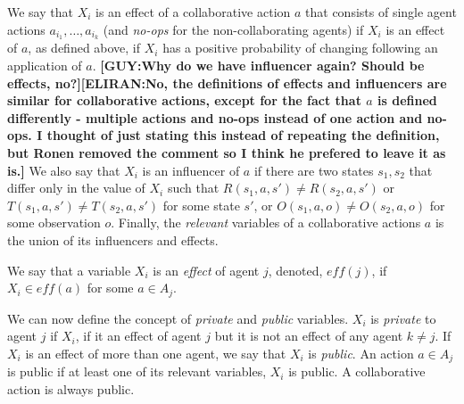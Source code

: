 \documentclass[letterpaper]{article} %
\theoremstyle{definition}
\newcommand{\eliran}[1]{\textbf{[\color{red}ELIRAN:#1]}}
\newcommand{\ronen}[1]{\textbf{[\color{blue}RONEN:#1]}}
\newcommand{\guy}[1]{\textbf{[\color{orange}GUY:#1]}}
\newcommand{\eff}{\mathit{eff}}
\begin{document}
We say that $X_i$ is an effect of a collaborative action $a$ that consists of single agent actions
$a_{i_1},\ldots,a_{i_k}$ (and {\em no-ops} for the non-collaborating agents) if $X_i$ is an effect of $a$, as defined above, if $X_i$ has a positive probability of changing following an application of $a$.
\guy{Why do we have influencer again? Should be effects, no?}\eliran{No, the definitions of effects and influencers are similar for collaborative actions, except for the fact that $a$ is defined differently - multiple actions and no-ops instead of one action and no-ops. I thought of just stating this instead of repeating the definition, but Ronen removed the comment so I think he prefered to leave it as is.}
We also say that $X_i$ is an influencer of $a$ if there are two states $s_1,s_2$ that differ only in the value of $X_i$ such that $R(s_1,a,s')\neq R(s_2,a,s')$ or $T(s_1,a,s')\neq T(s_2,a,s')$ for some state $s'$, or $O(s_1,a,o)\neq O(s_2,a,o)$ for some observation $o$.
Finally, the {\em relevant} variables of a collaborative actions $a$ is the union of its influencers and effects.
%


We say that a variable $X_i$ is an \emph{effect} of agent $j$, denoted,
$\eff(j)$, if  $X_i\in \eff(a)$ for some $a\in A_j$.

We can now define the concept of {\em private} and {\em public} variables. $X_i$ is {\em private} to agent $j$ if $X_i$, if it an effect of agent $j$ but it is not an effect of any agent $k\neq j$. If $X_i$ is an effect of more than one agent, we say that $X_i$ is {\em public}. 
An action $a\in A_j$ is public if at least one of its relevant variables, $X_i$ is public. A collaborative action is always public.
\end{document}
